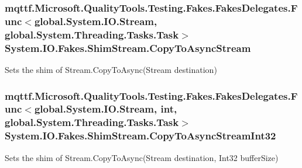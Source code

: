 \hypertarget{class_system_1_1_i_o_1_1_fakes_1_1_shim_stream_ac5bce375e21ec05be75d7b58faf70288}{
\subsubsection[{Copy\-To\-Async\-Stream}]{\setlength{\rightskip}{0pt plus 5cm}mqttf.\-Microsoft.\-Quality\-Tools.\-Testing.\-Fakes.\-Fakes\-Delegates.\-Func$<$global.\-System.\-I\-O.\-Stream, global.\-System.\-Threading.\-Tasks.\-Task$>$ System.\-I\-O.\-Fakes.\-Shim\-Stream.\-Copy\-To\-Async\-Stream\hspace{0.3cm}{\ttfamily [set]}}}\label{class_system_1_1_i_o_1_1_fakes_1_1_shim_stream_ac5bce375e21ec05be75d7b58faf70288}


Sets the shim of Stream.\-Copy\-To\-Async(\-Stream destination)

\hypertarget{class_system_1_1_i_o_1_1_fakes_1_1_shim_stream_a10b2e03bff692b190b7ee73138e2e1c2}{
\subsubsection[{Copy\-To\-Async\-Stream\-Int32}]{\setlength{\rightskip}{0pt plus 5cm}mqttf.\-Microsoft.\-Quality\-Tools.\-Testing.\-Fakes.\-Fakes\-Delegates.\-Func$<$global.\-System.\-I\-O.\-Stream, int, global.\-System.\-Threading.\-Tasks.\-Task$>$ System.\-I\-O.\-Fakes.\-Shim\-Stream.\-Copy\-To\-Async\-Stream\-Int32\hspace{0.3cm}{\ttfamily [set]}}}\label{class_system_1_1_i_o_1_1_fakes_1_1_shim_stream_a10b2e03bff692b190b7ee73138e2e1c2}


Sets the shim of Stream.\-Copy\-To\-Async(\-Stream destination, Int32 buffer\-Size)

